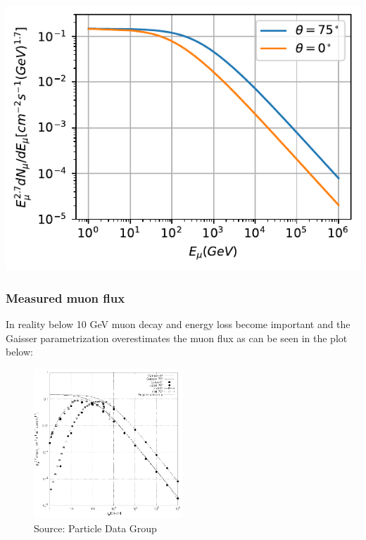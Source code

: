 \documentclass[
  letterpaper,
  DIV=11,
  numbers=noendperiod]{scrreprt}
\begin{document}
\begin{tcolorbox}[enhanced jigsaw, toprule=.15mm, colframe=quarto-callout-color-frame, bottomrule=.15mm, leftrule=.75mm, left=2mm, breakable, rightrule=.15mm, arc=.35mm, opacityback=0, colback=white]
\includegraphics{chap3_files/figure-pdf/cell-3-output-1.pdf}

\end{tcolorbox}

\subsubsection{Measured muon flux}\label{measured-muon-flux}

In reality below 10 GeV muon decay and energy loss become important and
the Gaisser parametrization overestimates the muon flux as can be seen
in the plot below:

\begin{figure}[H]

{\centering \includegraphics[width=0.5\textwidth,height=\textheight]{images/atmmu.png}

}

\caption{Source: Particle Data Group}

\end{figure}%
\end{document}
